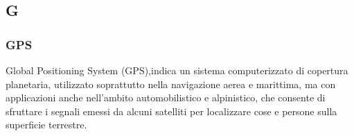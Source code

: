 \subsection*{\textbf{\hfill \Huge{G} \hfill}} 
\subsubsection*{GPS}
Global Positioning System (GPS),indica un sistema computerizzato di copertura planetaria, utilizzato soprattutto nella navigazione aerea e marittima, ma con applicazioni anche nell'ambito automobilistico e alpinistico, che consente di sfruttare i segnali emessi da alcuni satelliti per localizzare cose e persone sulla superficie terrestre.